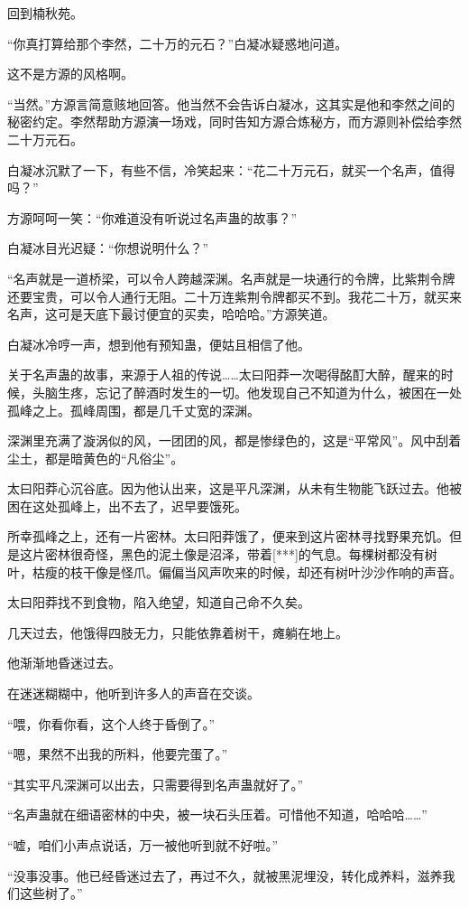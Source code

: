 \begin{this_body}
回到楠秋苑。

“你真打算给那个李然，二十万的元石？”白凝冰疑惑地问道。

这不是方源的风格啊。

“当然。”方源言简意赅地回答。他当然不会告诉白凝冰，这其实是他和李然之间的秘密约定。李然帮助方源演一场戏，同时告知方源合炼秘方，而方源则补偿给李然二十万元石。

白凝冰沉默了一下，有些不信，冷笑起来：“花二十万元石，就买一个名声，值得吗？”

方源呵呵一笑：“你难道没有听说过名声蛊的故事？”

白凝冰目光迟疑：“你想说明什么？”

“名声就是一道桥梁，可以令人跨越深渊。名声就是一块通行的令牌，比紫荆令牌还要宝贵，可以令人通行无阻。二十万连紫荆令牌都买不到。我花二十万，就买来名声，这可是天底下最讨便宜的买卖，哈哈哈。”方源笑道。

白凝冰冷哼一声，想到他有预知蛊，便姑且相信了他。

关于名声蛊的故事，来源于人祖的传说……太曰阳莽一次喝得酩酊大醉，醒来的时候，头脑生疼，忘记了醉酒时发生的一切。他发现自己不知道为什么，被困在一处孤峰之上。孤峰周围，都是几千丈宽的深渊。

深渊里充满了漩涡似的风，一团团的风，都是惨绿色的，这是“平常风”。风中刮着尘土，都是暗黄色的“凡俗尘”。

太曰阳莽心沉谷底。因为他认出来，这是平凡深渊，从未有生物能飞跃过去。他被困在这处孤峰上，出不去了，迟早要饿死。

所幸孤峰之上，还有一片密林。太曰阳莽饿了，便来到这片密林寻找野果充饥。但是这片密林很奇怪，黑色的泥土像是沼泽，带着[***]的气息。每棵树都没有树叶，枯瘦的枝干像是怪爪。偏偏当风声吹来的时候，却还有树叶沙沙作响的声音。

太曰阳莽找不到食物，陷入绝望，知道自己命不久矣。

几天过去，他饿得四肢无力，只能依靠着树干，瘫躺在地上。

他渐渐地昏迷过去。

在迷迷糊糊中，他听到许多人的声音在交谈。

“喂，你看你看，这个人终于昏倒了。”

“嗯，果然不出我的所料，他要完蛋了。”

“其实平凡深渊可以出去，只需要得到名声蛊就好了。”

“名声蛊就在细语密林的中央，被一块石头压着。可惜他不知道，哈哈哈……”

“嘘，咱们小声点说话，万一被他听到就不好啦。”

“没事没事。他已经昏迷过去了，再过不久，就被黑泥埋没，转化成养料，滋养我们这些树了。”


\end{this_body}
